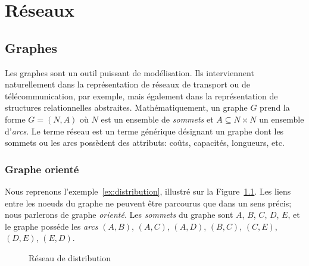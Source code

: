 \chapter{Réseaux}
\label{chap:networks}

\section{Graphes}

Les graphes sont un outil puissant de modélisation.
Ils interviennent naturellement dans la représentation de réseaux de transport ou de télécommunication, par exemple, mais également dans la représentation de structures relationnelles abstraites.
Mathématiquement, un graphe $G$ prend la forme $G = (N,A)$ où $N$ est
un ensemble de {\sl sommets} et $A \subseteq N \times N$ un ensemble d'{\sl arcs}.
Le terme réseau est un terme générique désignant un graphe dont les sommets ou les arcs possèdent des attributs: coûts, capacités, longueurs, etc.

\subsection{Graphe orienté}

\begin{example}

Nous reprenons l'exemple~\ref{ex:distribution}, illustré sur la Figure~\ref{fig:net_distribution}.
Les liens entre les noeuds du graphe ne peuvent être parcourus que dans un sens précis; nous parlerons de graphe {\sl orienté}.
Les {\sl sommets} du graphe sont $A$, $B$, $C$, $D$, $E$, et le graphe posséde les {\sl arcs} $(A,B)$, $(A,C)$, $(A,D)$, $(B,C)$, $(C,E)$, $(D,E)$, $(E,D)$.
\begin{figure}[htbp]
\begin{center}
\caption{Réseau de distribution}
\label{fig:net_distribution}
\end{center}
\end{figure}
\end{example}

